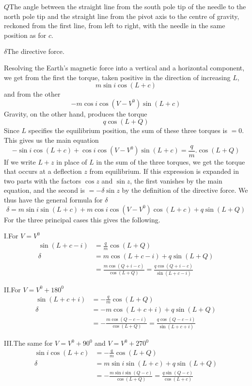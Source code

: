 $Q$\quad The angle between the straight line from the south pole tip of the needle to the north pole tip and the straight line from the pivot axis to the centre of gravity, reckoned from the first line, from left to right, with the needle in the same position as for $c$.

$\delta$\quad The directive force.

Resolving the Earth's magnetic force into a vertical and a horizontal component, we get from the first the torque, taken positive in the direction of increasing $L$,
\[
m\sin i\cos(L+c)
\]
and from the other
\[
-m\cos i\cos(V-V^0)\sin(L+c)
\]
Gravity, on the other hand, produces the torque
\[
q\cos(L+Q)
\]
Since $L$ specifies the equilibrium position, the sum of these three torques is $=0$. This gives us the main equation
\[
-\sin i\cos(L+c)+\cos i\cos(V-V^0)\sin(L+c)=\frac{q}{m}.\cos(L+Q)
\]
If we write $L+z$ in place of $L$ in the sum of the three torques, we get the torque that occurs at a deflection $z$ from equilibrium. If this expression is expanded in two parts with the factors $\cos z$ and $\sin z$, the first vanishes by the main equation, and the second is $=-\delta\sin z$ by the definition of the directive force.
We thus have the general formula for $\delta$
\[
\delta=m\sin i\sin(L+c)+m\cos i\cos(V-V^0)\cos(L+c)+q\sin(L+Q)
\]
For the three principal cases this gives the following.

I.\quad For $V=V^0$
\[
\begin{aligned}
\sin(L+c-i)&=\frac{q}{m}\cos(L+Q)\\
\delta&=m\cos(L+c-i)+q\sin(L+Q)\\
&=\frac{m\cos(Q+i-c)}{\cos(L+Q)}=\frac{q\cos(Q+i-c)}{\sin(L+c-i)}
\end{aligned}
\]

II.\quad For $V=V^0+180^0$
\[
\begin{aligned}
\sin(L+c+i)&=-\frac{q}{m}\cos(L+Q)\\
\delta&=-m\cos(L+c+i)+q\sin(L+Q)\\
&=-\frac{m\cos(Q-c-i)}{\cos(L+Q)}=\frac{q\cos(Q-c-i)}{\sin(L+c+i)}
\end{aligned}
\]

III.\quad The same for $V=V^0+90^0$ and $V=V^0+270^0$
\[
\begin{aligned}
\sin i\cos(L+c)&=-\frac{q}{m}\cos(L+Q)\\
\delta&=m\sin i\sin(L+c)+q\sin(L+Q)\\
&=-\frac{m\sin i\sin(Q-c)}{\cos(L+Q)}=\frac{q\sin(Q-c)}{\cos(L+c)}
\end{aligned}
\]

